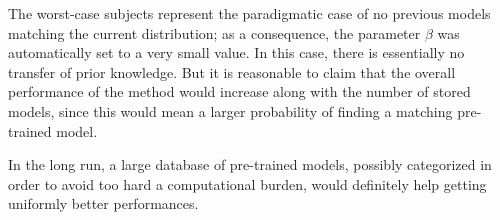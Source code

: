The worst-case subjects represent the paradigmatic case of no previous
models matching the current distribution; as a consequence, the
parameter $\beta$ was automatically set to a very small value. In this
case, there is essentially no transfer of prior knowledge. But it
is reasonable to claim that the overall performance of the method
would increase along with the number of stored models, since this
would mean a larger probability of finding a matching pre-trained
model.

In the long run, a large database of pre-trained models, possibly
categorized in order to avoid too hard a computational burden, would
definitely help getting uniformly better performances.
